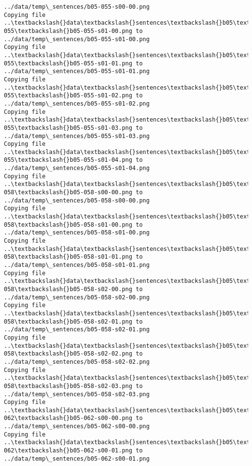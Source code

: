 \documentclass[11pt]{article}
\begin{document}
\begin{Verbatim}[commandchars=\\\{\}]
../data/temp\_sentences/b05-055-s00-00.png
Copying file ..\textbackslash{}data\textbackslash{}sentences\textbackslash{}b05\textbackslash{}b05-055\textbackslash{}b05-055-s01-00.png to
../data/temp\_sentences/b05-055-s01-00.png
Copying file ..\textbackslash{}data\textbackslash{}sentences\textbackslash{}b05\textbackslash{}b05-055\textbackslash{}b05-055-s01-01.png to
../data/temp\_sentences/b05-055-s01-01.png
Copying file ..\textbackslash{}data\textbackslash{}sentences\textbackslash{}b05\textbackslash{}b05-055\textbackslash{}b05-055-s01-02.png to
../data/temp\_sentences/b05-055-s01-02.png
Copying file ..\textbackslash{}data\textbackslash{}sentences\textbackslash{}b05\textbackslash{}b05-055\textbackslash{}b05-055-s01-03.png to
../data/temp\_sentences/b05-055-s01-03.png
Copying file ..\textbackslash{}data\textbackslash{}sentences\textbackslash{}b05\textbackslash{}b05-055\textbackslash{}b05-055-s01-04.png to
../data/temp\_sentences/b05-055-s01-04.png
Copying file ..\textbackslash{}data\textbackslash{}sentences\textbackslash{}b05\textbackslash{}b05-058\textbackslash{}b05-058-s00-00.png to
../data/temp\_sentences/b05-058-s00-00.png
Copying file ..\textbackslash{}data\textbackslash{}sentences\textbackslash{}b05\textbackslash{}b05-058\textbackslash{}b05-058-s01-00.png to
../data/temp\_sentences/b05-058-s01-00.png
Copying file ..\textbackslash{}data\textbackslash{}sentences\textbackslash{}b05\textbackslash{}b05-058\textbackslash{}b05-058-s01-01.png to
../data/temp\_sentences/b05-058-s01-01.png
Copying file ..\textbackslash{}data\textbackslash{}sentences\textbackslash{}b05\textbackslash{}b05-058\textbackslash{}b05-058-s02-00.png to
../data/temp\_sentences/b05-058-s02-00.png
Copying file ..\textbackslash{}data\textbackslash{}sentences\textbackslash{}b05\textbackslash{}b05-058\textbackslash{}b05-058-s02-01.png to
../data/temp\_sentences/b05-058-s02-01.png
Copying file ..\textbackslash{}data\textbackslash{}sentences\textbackslash{}b05\textbackslash{}b05-058\textbackslash{}b05-058-s02-02.png to
../data/temp\_sentences/b05-058-s02-02.png
Copying file ..\textbackslash{}data\textbackslash{}sentences\textbackslash{}b05\textbackslash{}b05-058\textbackslash{}b05-058-s02-03.png to
../data/temp\_sentences/b05-058-s02-03.png
Copying file ..\textbackslash{}data\textbackslash{}sentences\textbackslash{}b05\textbackslash{}b05-062\textbackslash{}b05-062-s00-00.png to
../data/temp\_sentences/b05-062-s00-00.png
Copying file ..\textbackslash{}data\textbackslash{}sentences\textbackslash{}b05\textbackslash{}b05-062\textbackslash{}b05-062-s00-01.png to
../data/temp\_sentences/b05-062-s00-01.png

\end{Verbatim}
\end{document}

